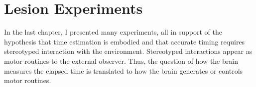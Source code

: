\chapter{Lesion Experiments} \label{ch:lesion}
In the last chapter, I presented many experiments, all in support of the hypothesis that time estimation is embodied and that accurate timing requires stereotyped interaction with the environment.
Stereotyped interactions appear as motor routines to the external observer.
Thus, the question of how the brain measures the elapsed time is translated to how the brain generates or controls motor routines.




